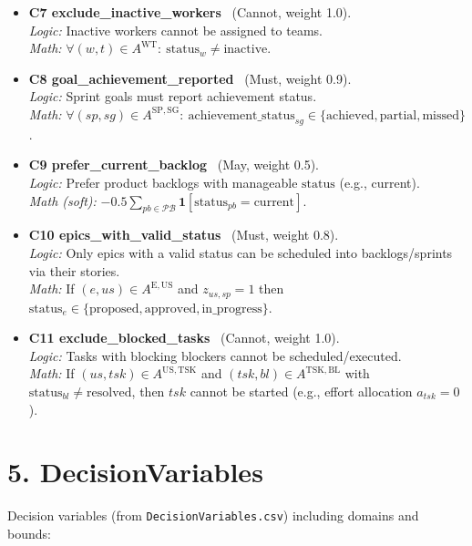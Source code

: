 \documentclass[11pt,a4paper]{article}
\begin{document}
\begin{itemize}[leftmargin=2em]
  \item \textbf{C7 exclude\_inactive\_workers} \ (Cannot, weight 1.0). \\
  \emph{Logic:} Inactive workers cannot be assigned to teams. \\
  \emph{Math:} \(\forall (w,t)\in A^{\mathrm{WT}}:\ \text{status}_{w}\neq\text{inactive}\).

  \item \textbf{C8 goal\_achievement\_reported} \ (Must, weight 0.9). \\
  \emph{Logic:} Sprint goals must report achievement status. \\
  \emph{Math:} \(\forall (sp,sg)\in A^{\mathrm{SP,SG}}:\ \text{achievement\_status}_{sg}\in\{\text{achieved},\text{partial},\text{missed}\}\).

  \item \textbf{C9 prefer\_current\_backlog} \ (May, weight 0.5). \\
  \emph{Logic:} Prefer product backlogs with manageable \(\text{status}\) (e.g., current). \\
  \emph{Math (soft):} \(-0.5\sum_{pb\in\mathcal{PB}}\mathbf{1}[\text{status}_{pb}=\text{current}]\).

  \item \textbf{C10 epics\_with\_valid\_status} \ (Must, weight 0.8). \\
  \emph{Logic:} Only epics with a valid status can be scheduled into backlogs/sprints via their stories. \\
  \emph{Math:} If \((e,us)\in A^{\mathrm{E,US}}\) and \(z_{us,sp}=1\) then \(\text{status}_{e}\in\{\text{proposed},\text{approved},\text{in\_progress}\}\).

  \item \textbf{C11 exclude\_blocked\_tasks} \ (Cannot, weight 1.0). \\
  \emph{Logic:} Tasks with blocking blockers cannot be scheduled/executed. \\
  \emph{Math:} If \((us,tsk)\in A^{\mathrm{US,TSK}}\) and \((tsk,bl)\in A^{\mathrm{TSK,BL}}\) with \(\text{status}_{bl}\neq\text{resolved}\), then \(tsk\) cannot be started (e.g., effort allocation \(a_{tsk}=0\)).
\end{itemize}

\section{5. DecisionVariables}
Decision variables (from \texttt{DecisionVariables.csv}) including domains and bounds:
\end{document}
